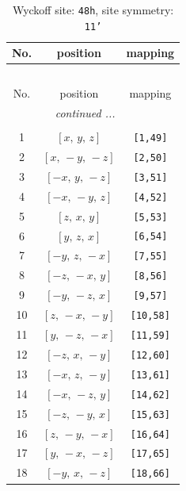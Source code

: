 \documentclass[fleqn,8pt]{jsarticle}
\begin{document}
\begin{longtable}{ccc}
\caption{Wyckoff site: {\tt 48h}, site symmetry: {\tt 11'}}
 \\
 \hline \hline
No. & position & mapping \\ \hline \endfirsthead

\multicolumn{2}{l}{\tablename\ \thetable{}} \\
 \hline \hline
No. & position & mapping \\ \hline \endhead

 \hline \hline
\multicolumn{2}{r}{\footnotesize\it continued ...} \\ \endfoot

 \hline \hline
\multicolumn{2}{r}{} \\ \endlastfoot

1 & $\left[ x,\, y,\, z \right]$ & {\tt [1,49]} \\ \hline
2 & $\left[ x,\, - y,\, - z \right]$ & {\tt [2,50]} \\ \hline
3 & $\left[ - x,\, y,\, - z \right]$ & {\tt [3,51]} \\ \hline
4 & $\left[ - x,\, - y,\, z \right]$ & {\tt [4,52]} \\ \hline
5 & $\left[ z,\, x,\, y \right]$ & {\tt [5,53]} \\ \hline
6 & $\left[ y,\, z,\, x \right]$ & {\tt [6,54]} \\ \hline
7 & $\left[ - y,\, z,\, - x \right]$ & {\tt [7,55]} \\ \hline
8 & $\left[ - z,\, - x,\, y \right]$ & {\tt [8,56]} \\ \hline
9 & $\left[ - y,\, - z,\, x \right]$ & {\tt [9,57]} \\ \hline
10 & $\left[ z,\, - x,\, - y \right]$ & {\tt [10,58]} \\ \hline
11 & $\left[ y,\, - z,\, - x \right]$ & {\tt [11,59]} \\ \hline
12 & $\left[ - z,\, x,\, - y \right]$ & {\tt [12,60]} \\ \hline
13 & $\left[ - x,\, z,\, - y \right]$ & {\tt [13,61]} \\ \hline
14 & $\left[ - x,\, - z,\, y \right]$ & {\tt [14,62]} \\ \hline
15 & $\left[ - z,\, - y,\, x \right]$ & {\tt [15,63]} \\ \hline
16 & $\left[ z,\, - y,\, - x \right]$ & {\tt [16,64]} \\ \hline
17 & $\left[ y,\, - x,\, - z \right]$ & {\tt [17,65]} \\ \hline
18 & $\left[ - y,\, x,\, - z \right]$ & {\tt [18,66]} \\ \hline

\end{longtable}
\end{document}

